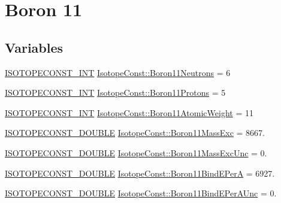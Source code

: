 \hypertarget{group___isotope_const-_boron-_b11}{}\section{Boron 11}
\label{group___isotope_const-_boron-_b11}
\subsection*{Variables}
\begin{DoxyCompactItemize}
\item 
\mbox{\hyperlink{group___isotope_const-_macros_ga5f18360b3e99483a35c32d789e62621c}{I\+S\+O\+T\+O\+P\+E\+C\+O\+N\+S\+T\+\_\+\+I\+NT}} \mbox{\hyperlink{group___isotope_const-_boron-_b11_gab7a5fafe248988003b0b58f44d7e09d2}{Isotope\+Const\+::\+Boron11\+Neutrons}} = 6
\item 
\mbox{\hyperlink{group___isotope_const-_macros_ga5f18360b3e99483a35c32d789e62621c}{I\+S\+O\+T\+O\+P\+E\+C\+O\+N\+S\+T\+\_\+\+I\+NT}} \mbox{\hyperlink{group___isotope_const-_boron-_b11_ga6b659d4aa47824b2a74efb81d9348608}{Isotope\+Const\+::\+Boron11\+Protons}} = 5
\item 
\mbox{\hyperlink{group___isotope_const-_macros_ga5f18360b3e99483a35c32d789e62621c}{I\+S\+O\+T\+O\+P\+E\+C\+O\+N\+S\+T\+\_\+\+I\+NT}} \mbox{\hyperlink{group___isotope_const-_boron-_b11_ga7fec159eec793dab752925179d31c28f}{Isotope\+Const\+::\+Boron11\+Atomic\+Weight}} = 11
\item 
\mbox{\hyperlink{group___isotope_const-_macros_ga8f45a7272ce02c0b4c65c44636ed719a}{I\+S\+O\+T\+O\+P\+E\+C\+O\+N\+S\+T\+\_\+\+D\+O\+U\+B\+LE}} \mbox{\hyperlink{group___isotope_const-_boron-_b11_ga931bd8d9c104966265dcaa1c7f2bc16a}{Isotope\+Const\+::\+Boron11\+Mass\+Exc}} = 8667.
\item 
\mbox{\hyperlink{group___isotope_const-_macros_ga8f45a7272ce02c0b4c65c44636ed719a}{I\+S\+O\+T\+O\+P\+E\+C\+O\+N\+S\+T\+\_\+\+D\+O\+U\+B\+LE}} \mbox{\hyperlink{group___isotope_const-_boron-_b11_ga9dfb1f29fafba2ed3d49ea85f32ae768}{Isotope\+Const\+::\+Boron11\+Mass\+Exc\+Unc}} = 0.
\item 
\mbox{\hyperlink{group___isotope_const-_macros_ga8f45a7272ce02c0b4c65c44636ed719a}{I\+S\+O\+T\+O\+P\+E\+C\+O\+N\+S\+T\+\_\+\+D\+O\+U\+B\+LE}} \mbox{\hyperlink{group___isotope_const-_boron-_b11_ga5ba4893d3ad5e8728e445b47213d1412}{Isotope\+Const\+::\+Boron11\+Bind\+E\+PerA}} = 6927.
\item 
\mbox{\hyperlink{group___isotope_const-_macros_ga8f45a7272ce02c0b4c65c44636ed719a}{I\+S\+O\+T\+O\+P\+E\+C\+O\+N\+S\+T\+\_\+\+D\+O\+U\+B\+LE}} \mbox{\hyperlink{group___isotope_const-_boron-_b11_gab8ba10f0a638ada230fcf7998f3ba93a}{Isotope\+Const\+::\+Boron11\+Bind\+E\+Per\+A\+Unc}} = 0.

\end{DoxyCompactItemize}
